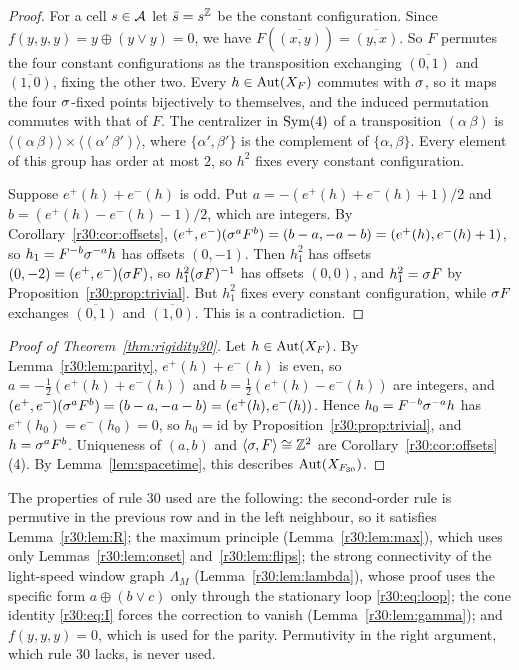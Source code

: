 \begin{proof}
For a cell $s\in\mathcal{A}$ let $\bar s=s^{\mathbb{Z}}$ be the constant configuration. Since $f(y,y,y)=y\oplus(y\vee y)=0$, we have $F(\overline{(x,y)})=\overline{(y,x)}$. So $F$ permutes the four constant configurations as the transposition exchanging $\overline{(0,1)}$ and $\overline{(1,0)}$, fixing the other two. Every $h\in\operatorname{Aut}(X_F)$ commutes with $\sigma$, so it maps the four $\sigma$-fixed points bijectively to themselves, and the induced permutation commutes with that of $F$. The centralizer in $\operatorname{Sym}(4)$ of a transposition $(\alpha\,\beta)$ is $\langle(\alpha\,\beta)\rangle\times\langle(\alpha'\,\beta')\rangle$, where $\{\alpha',\beta'\}$ is the complement of $\{\alpha,\beta\}$. Every element of this group has order at most $2$, so $h^2$ fixes every constant configuration.

Suppose $e^+(h)+e^-(h)$ is odd. Put $a=-(e^+(h)+e^-(h)+1)/2$ and $b=(e^+(h)-e^-(h)-1)/2$, which are integers. By Corollary~\ref{r30:cor:offsets}, $(e^+,e^-)(\sigma^aF^b)=(b-a,-a-b)=(e^+(h),e^-(h)+1)$, so $h_1=F^{-b}\sigma^{-a}h$ has offsets $(0,-1)$. Then $h_1^2$ has offsets $(0,-2)=(e^+,e^-)(\sigma F)$, so $h_1^2(\sigma F)^{-1}$ has offsets $(0,0)$, and $h_1^2=\sigma F$ by Proposition~\ref{r30:prop:trivial}. But $h_1^2$ fixes every constant configuration, while $\sigma F$ exchanges $\overline{(0,1)}$ and $\overline{(1,0)}$. This is a contradiction.
\end{proof}

\begin{proof}[Proof of Theorem~\ref{thm:rigidity30}]
Let $h\in\operatorname{Aut}(X_F)$. By Lemma~\ref{r30:lem:parity}, $e^+(h)+e^-(h)$ is even, so $a=-\tfrac12(e^+(h)+e^-(h))$ and $b=\tfrac12(e^+(h)-e^-(h))$ are integers, and $(e^+,e^-)(\sigma^aF^b)=(b-a,-a-b)=(e^+(h),e^-(h))$. Hence $h_0=F^{-b}\sigma^{-a}h$ has $e^+(h_0)=e^-(h_0)=0$, so $h_0=\mathrm{id}$ by Proposition~\ref{r30:prop:trivial}, and $h=\sigma^aF^b$. Uniqueness of $(a,b)$ and $\langle\sigma,F\rangle\cong\mathbb{Z}^2$ are Corollary~\ref{r30:cor:offsets}(4). By Lemma~\ref{lem:spacetime}, this describes $\operatorname{Aut}(X_{F_{30}})$.
\end{proof}

\begin{remark}
The properties of rule $30$ used are the following: the second-order rule is permutive in the previous row and in the left neighbour, so it satisfies Lemma~\ref{r30:lem:R}; the maximum principle (Lemma~\ref{r30:lem:max}), which uses only Lemmas~\ref{r30:lem:onset} and~\ref{r30:lem:flips}; the strong connectivity of the light-speed window graph $\Lambda_M$ (Lemma~\ref{r30:lem:lambda}), whose proof uses the specific form $a\oplus(b\vee c)$ only through the stationary loop \eqref{r30:eq:loop}; the cone identity \eqref{r30:eq:I} forces the correction to vanish (Lemma~\ref{r30:lem:gamma}); and $f(y,y,y)=0$, which is used for the parity. Permutivity in the right argument, which rule $30$ lacks, is never used.
\end{remark}
